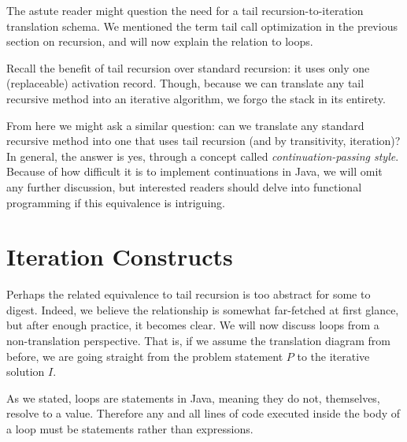 The astute reader might question the need for a tail recursion-to-iteration translation schema. We mentioned the term tail call optimization in the previous section on recursion, and will now explain the relation to loops.

Recall the benefit of tail recursion over standard recursion: it uses only one (replaceable) activation record. Though, because we can translate any tail recursive method into an iterative algorithm, we forgo the stack in its entirety.

From here we might ask a similar question: can we translate any standard recursive method into one that uses tail recursion (and by transitivity, iteration)? In general, the answer is yes, through a concept called \textit{continuation-passing style}. Because of how difficult it is to implement continuations in Java, we will omit any further discussion, but interested readers should delve into functional programming if this equivalence is intriguing.

\section*{Iteration Constructs}

Perhaps the related equivalence to tail recursion is too abstract for some to digest. Indeed, we believe the relationship is somewhat far-fetched at first glance, but after enough practice, it becomes clear. We will now discuss loops from a non-translation perspective. That is, if we assume the translation diagram from before, we are going straight from the problem statement $P$ to the iterative solution $I$.

As we stated, loops are statements in Java, meaning they do not, themselves, resolve to a value. Therefore any and all lines of code executed inside the body of a loop must be statements rather than expressions.


